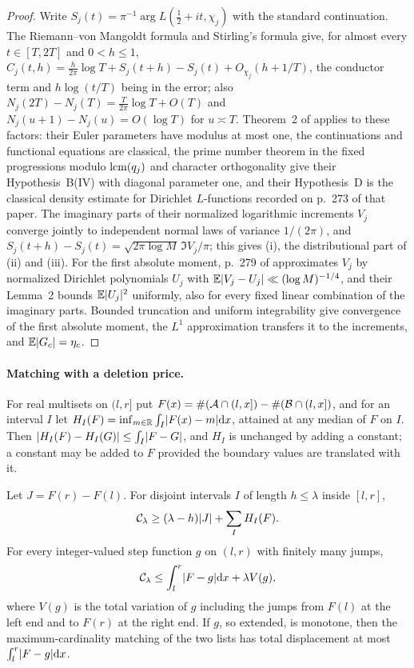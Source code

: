 \begin{proof}
Write $S_j(t)=\pi^{-1}\arg L(\tfrac12+it,\chi_j)$ with the standard continuation. The Riemann--von Mangoldt
formula and Stirling's formula give, for almost every $t\in[T,2T]$ and $0<h\le1$,
$C_j(t,h)=\frac h{2\pi}\log T+S_j(t+h)-S_j(t)+O_{\chi_j}(h+1/T)$, the conductor term and $h\log(t/T)$ being in the
error; also $N_j(2T)-N_j(T)=\frac T{2\pi}\log T+O(T)$ and $N_j(u+1)-N_j(u)=O(\log T)$ for $u\asymp T$. Theorem~2 of
\cite{BombieriPerelli1998Distinct} applies to these factors: their Euler parameters have modulus at most one,
the continuations and functional equations are classical, the prime number theorem in the fixed progressions
modulo $\operatorname{lcm}(q_j)$ and character orthogonality give their Hypothesis~B(IV) with diagonal parameter one, and
their Hypothesis~D is the classical density estimate for Dirichlet $L$-functions recorded on p.~273 of that
paper. The imaginary parts of their normalized logarithmic increments $V_j$ converge jointly to independent
normal laws of variance $1/(2\pi)$, and $S_j(t+h)-S_j(t)=\sqrt{2\pi\log M}\,\Im V_j/\pi$; this gives (i), the
distributional part of (ii) and (iii). For the first absolute moment, p.~279 of \cite{BombieriPerelli1998Distinct}
approximates $V_j$ by normalized Dirichlet polynomials $U_j$ with $\mathbb{E}\lvert V_j-U_j\rvert\ll(\log M)^{-1/4}$, and
their Lemma~2 bounds $\mathbb{E}\lvert U_j\rvert^2$ uniformly, also for every fixed linear combination of the imaginary
parts. Bounded truncation and uniform integrability give convergence of the first absolute moment, the $L^1$
approximation transfers it to the increments, and $\mathbb{E}\lvert G_c\rvert=\eta_c$.
\end{proof}

\paragraph{Matching with a deletion price.}
For real multisets on $(l,r]$ put $F(x)=\#(\mathcal{A}\cap(l,x])-\#(\mathcal{B}\cap(l,x])$, and for an interval $I$ let
$H_I(F)=\inf_{m\in\mathbb{R}}\int_I\lvert F(x)-m\rvert\mathrm{d} x$, attained at any median of $F$ on $I$. Then
$\lvert H_I(F)-H_I(G)\rvert\le\int_I\lvert F-G\rvert$, and $H_I$ is unchanged by adding a constant; a constant may be added to
$F$ provided the boundary values are translated with it.

\begin{lemma}\label{chz:lem:flow}
Let $J=F(r)-F(l)$. For disjoint intervals $I$ of length $h\le\lambda$ inside $[l,r]$,
\begin{equation}\label{chz:eq:flowlower}
 \mathcal{C}_\lambda\ge(\lambda-h)\lvert J\rvert+\sum_IH_I(F).
\end{equation}
For every integer-valued step function $g$ on $(l,r)$ with finitely many jumps,
\begin{equation}\label{chz:eq:flowupper}
 \mathcal{C}_\lambda\le\int_l^r\lvert F-g\rvert\mathrm{d} x+\lambda V(g),
\end{equation}
where $V(g)$ is the total variation of $g$ including the jumps from $F(l)$ at the left end and to $F(r)$ at
the right end. If $g$, so extended, is monotone, then the maximum-cardinality matching of the two lists has
total displacement at most $\int_l^r\lvert F-g\rvert\mathrm{d} x$.
\end{lemma}


